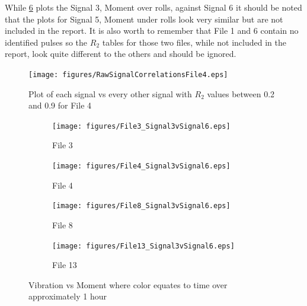 \documentclass[]{article}
\begin{document}
While \cref{fig:RawSignalCorrelationsFile1_Caption} plots the Signal 3, Moment over rolls, against Signal 6 it should be noted that the plots for Signal 5, Moment under rolls look very similar but are not included in the report. It is also worth to remember that File 1 and 6 contain no identified pulses so the $R_2$ tables for those two files, while not included in the report, look quite different to the others and should be ignored.

\begin{center}
\begin{scriptsize}
 
\end{scriptsize}
\label{correlationTable}
\end{center}

\begin{figure}[H]
    \centering
    \texttt{[image: figures/RawSignalCorrelationsFile4.eps]}
    \caption{Plot of each signal vs every other signal with $R_2$ values between 0.2 and 0.9 for File 4}
    \label{fig:RawSignalCorrelationsFile1}
\end{figure}


\begin{figure}[H]
	\captionsetup[subfigure]{}
    \centering
		\begin{subfigure}{.45\textwidth}
		  	\centering
    			\texttt{[image: figures/File3\_Signal3vSignal6.eps]}
		  	\caption{File 3}
		  	\label{fig:File3_Signal3vSignal6}
		\end{subfigure}
		\hspace{\fill}
		\begin{subfigure}{.45\textwidth}
		  	\centering
 		   	\texttt{[image: figures/File4\_Signal3vSignal6.eps]}
		  	\caption{File 4}
		  	\label{fig:File4_Signal3vSignal6}
		\end{subfigure}  
	\bigskip    
    \centering
		\begin{subfigure}{.45\textwidth}
		  	\centering
    			\texttt{[image: figures/File8\_Signal3vSignal6.eps]}
		  	\caption{File 8}
		  	\label{fig:File8_Signal3vSignal6}
		\end{subfigure}
		\hspace{\fill}
		\begin{subfigure}{.45\textwidth}
		  	\centering
 		   	\texttt{[image: figures/File13\_Signal3vSignal6.eps]}
		  	\caption{File 13}
		  	\label{fig:File13_Signal3vSignal6}
		\end{subfigure}
    \caption{Vibration vs Moment where color equates to time over approximately 1 hour}
    \label{fig:RawSignalCorrelationsFile1_Caption}    
\end{figure}
\end{document}
